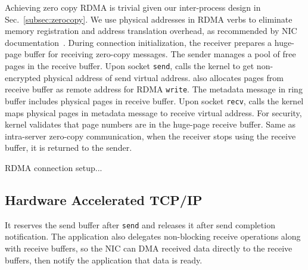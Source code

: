 Achieving zero copy RDMA is trivial given our inter-process design in Sec.~\ref{subsec:zerocopy}. We use physical addresses in RDMA verbs to eliminate memory registration and address translation overhead, as recommended by NIC documentation~\cite{mellanox}. During connection initialization, the receiver prepares a huge-page buffer for receiving zero-copy messages. The sender manages a pool of free pages in the receive buffer. Upon socket \texttt{send}, \libipc calls the kernel to get non-encrypted physical address of send virtual address. \libipc also allocates pages from receive buffer as remote address for RDMA \texttt{write}. The metadata message in ring buffer includes physical pages in receive buffer. Upon socket \texttt{recv}, \libipc calls the kernel maps physical pages in metadata message to receive virtual address. For security, kernel validates that page numbers are in the huge-page receive buffer. Same as intra-server zero-copy communication, when the receiver stops using the receive buffer, it is returned to the sender.

RDMA connection setup...


\subsection{Hardware Accelerated TCP/IP}

 It reserves the send buffer after \texttt{send} and releases it after send completion notification.
The application also delegates non-blocking receive operations along with receive buffers, so the NIC can DMA received data directly to the receive buffers, then notify the application that data is ready.
